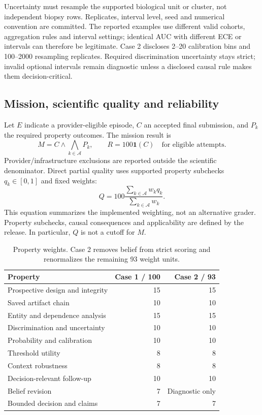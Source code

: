 \documentclass[11pt,a4paper]{article}
\begin{document}
Uncertainty must resample the supported biological unit or cluster, not independent biopsy rows. Replicates, interval level, seed and numerical convention are committed. The reported examples use different valid cohorts, aggregation rules and interval settings; identical AUC with different ECE or intervals can therefore be legitimate. Case 2 discloses 2--20 calibration bins and 100--2000 resampling replicates. Required discrimination uncertainty stays strict; invalid optional intervals remain diagnostic unless a disclosed causal rule makes them decision-critical.

\subsection{Mission, scientific quality and reliability}

Let $E$ indicate a provider-eligible episode, $C$ an accepted final submission, and $P_k$ the required property outcomes. The mission result is
\begin{equation}
 M=C\land\bigwedge_{k\in\mathcal A}P_k,\qquad
 R=100\mathbf{1}(C)\quad\text{for eligible attempts}.
\end{equation}
Provider/infrastructure exclusions are reported outside the scientific denominator. Direct partial quality uses supported property subchecks $q_k\in[0,1]$ and fixed weights:
\begin{equation}
 Q=100\frac{\sum_{k\in\mathcal A} w_k q_k}{\sum_{k\in\mathcal A}w_k}.
\end{equation}
This equation summarizes the implemented weighting, not an alternative grader. Property subchecks, causal consequences and applicability are defined by the release. In particular, $Q$ is not a cutoff for $M$.

\begin{table}[H]\small
\caption{Property weights. Case 2 removes belief from strict scoring and renormalizes the remaining 93 weight units.}
\begin{tabularx}{\textwidth}{@{}Yrr@{}}\toprule
Property & Case 1 / 100 & Case 2 / 93 \\\midrule
Prospective design and integrity & 15 & 15 \\
Saved artifact chain & 10 & 10 \\
Entity and dependence analysis & 15 & 15 \\
Discrimination and uncertainty & 10 & 10 \\
Probability and calibration & 10 & 10 \\
Threshold utility & 8 & 8 \\
Context robustness & 8 & 8 \\
Decision-relevant follow-up & 10 & 10 \\
Belief revision & 7 & Diagnostic only \\
Bounded decision and claims & 7 & 7 \\\bottomrule
\end{tabularx}
\end{table}
\end{document}
